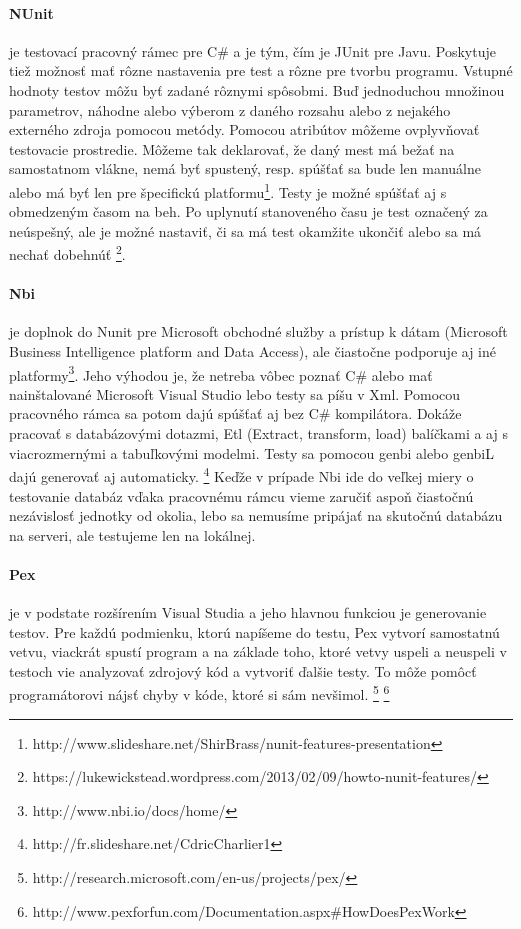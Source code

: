 \documentclass[11pt,twoside,slovak,a4paper]{article}
\begin{document}
		\paragraph{NUnit} je testovací pracovný rámec pre C\# a je tým, čím je JUnit pre Javu.
		Poskytuje tiež možnosť mať rôzne nastavenia pre test a rôzne pre tvorbu programu.
		Vstupné hodnoty testov môžu byť zadané rôznymi spôsobmi. Buď jednoduchou množinou parametrov, náhodne alebo výberom z daného rozsahu alebo z nejakého externého zdroja pomocou metódy.
		Pomocou atribútov môžeme ovplyvňovať testovacie prostredie. Môžeme tak deklarovať, že daný mest má bežať na samostatnom vlákne, nemá byť spustený, resp. spúšťať sa bude len manuálne alebo má byť len pre špecifickú platformu\footnote{http://www.slideshare.net/ShirBrass/nunit-features-presentation}.
		Testy je možné spúšťať aj s obmedzeným časom na beh. Po uplynutí stanoveného času je test označený za neúspešný, ale je možné nastaviť, či sa má test okamžite ukončiť alebo sa má nechať dobehnúť \footnote{https://lukewickstead.wordpress.com/2013/02/09/howto-nunit-features/}.
		
		\paragraph{Nbi} je doplnok do Nunit pre Microsoft obchodné služby a prístup k dátam (Microsoft Business Intelligence platform and Data Access), ale čiastočne podporuje aj iné platformy\footnote{http://www.nbi.io/docs/home/}. Jeho výhodou je, že netreba vôbec poznať C\# alebo mať nainštalované Microsoft Visual Studio lebo testy sa píšu v Xml. Pomocou pracovného rámca sa potom dajú spúšťať aj bez C\# kompilátora. Dokáže pracovať s databázovými dotazmi, Etl (Extract, transform, load) balíčkami a aj s viacrozmernými a tabuľkovými modelmi.
		Testy sa pomocou genbi alebo genbiL dajú generovať aj automaticky. \footnote{http://fr.slideshare.net/CdricCharlier1}
		Keďže v prípade Nbi ide do veľkej miery o testovanie databáz vďaka pracovnému rámcu vieme zaručiť aspoň čiastočnú nezávislosť jednotky od okolia, lebo sa nemusíme pripájať na skutočnú databázu na serveri, ale testujeme len na lokálnej.
		
		
		\paragraph{Pex} je v podstate rozšírením Visual Studia a jeho hlavnou funkciou je generovanie testov. Pre každú podmienku, ktorú napíšeme do testu, Pex vytvorí samostatnú vetvu, viackrát spustí program a na základe toho, ktoré vetvy uspeli a neuspeli v testoch vie analyzovať zdrojový kód a vytvoriť ďalšie testy. To môže pomôcť programátorovi nájsť chyby v kóde, ktoré si sám nevšimol. \footnote{http://research.microsoft.com/en-us/projects/pex/}
		\footnote{http://www.pexforfun.com/Documentation.aspx\#HowDoesPexWork}
		
\end{document}
